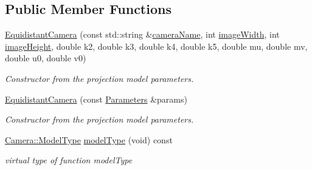 \subsection*{Public Member Functions}
\begin{DoxyCompactItemize}
\item 
\mbox{\label{classcamodocal_1_1EquidistantCamera_ad00dbcd6ff79c1a86009fdb168e8f912}} 
\hyperlink{classcamodocal_1_1EquidistantCamera_ad00dbcd6ff79c1a86009fdb168e8f912}{Equidistant\+Camera} (const std\+::string \&\hyperlink{classcamodocal_1_1EquidistantCamera_a985ec4cd98fed18f5201551b24cf1d8b}{camera\+Name}, int \hyperlink{classcamodocal_1_1EquidistantCamera_a90ff17672aca7c81cd56d8541cbb3190}{image\+Width}, int \hyperlink{classcamodocal_1_1EquidistantCamera_a7db0d67a1c27897c04e3ae1635207433}{image\+Height}, double k2, double k3, double k4, double k5, double mu, double mv, double u0, double v0)
\begin{DoxyCompactList}\small\item\em Constructor from the projection model parameters. \end{DoxyCompactList}\item 
\mbox{\label{classcamodocal_1_1EquidistantCamera_a9f83afd3d68f9cde56e669b62498133f}} 
\hyperlink{classcamodocal_1_1EquidistantCamera_a9f83afd3d68f9cde56e669b62498133f}{Equidistant\+Camera} (const \hyperlink{classcamodocal_1_1EquidistantCamera_1_1Parameters}{Parameters} \&params)
\begin{DoxyCompactList}\small\item\em Constructor from the projection model parameters. \end{DoxyCompactList}\item 
\mbox{\label{classcamodocal_1_1EquidistantCamera_a5fbae9e11f1bfdc4f8c221b3525c34a6}} 
\hyperlink{classcamodocal_1_1Camera_a663bb19b7b1f38f6d1b7eeb0890183ff}{Camera\+::\+Model\+Type} \hyperlink{classcamodocal_1_1EquidistantCamera_a5fbae9e11f1bfdc4f8c221b3525c34a6}{model\+Type} (void) const
\begin{DoxyCompactList}\small\item\em virtual type of function model\+Type \end{DoxyCompactList}\item 
\mbox{\label{classcamodocal_1_1EquidistantCamera_a985ec4cd98fed18f5201551b24cf1d8b}} 

\end{DoxyCompactItemize}
